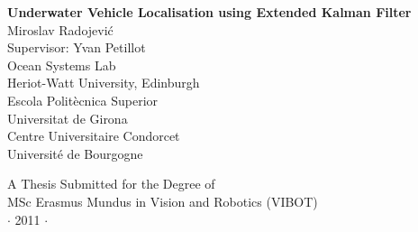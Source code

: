 
\newpage
\thispagestyle{empty}


\vspace*{2cm}
\begin{center}
{\Large\bf Underwater Vehicle Localisation using Extended Kalman Filter\\} \vspace{2cm} {\large
Miroslav Radojevi\'c \\
\vspace{1cm}
Supervisor: Yvan Petillot    \\
\vspace{3cm}
Ocean Systems Lab \\
Heriot-Watt University, Edinburgh  \\
\vspace{0.5cm}
Escola Polit\`{e}cnica Superior \\
Universitat de Girona \\ 
\vspace{0.5cm}
Centre Universitaire Condorcet \\
Universit\'{e} de Bourgogne  
}

\end{center}

\vspace{2.5cm}
\begin{center}
{\large A Thesis Submitted for the Degree of \\MSc Erasmus Mundus
in Vision and Robotics (VIBOT) \\\vspace{0.3cm} $\cdot$ 2011
$\cdot$}
\end{center}
\singlespacing


